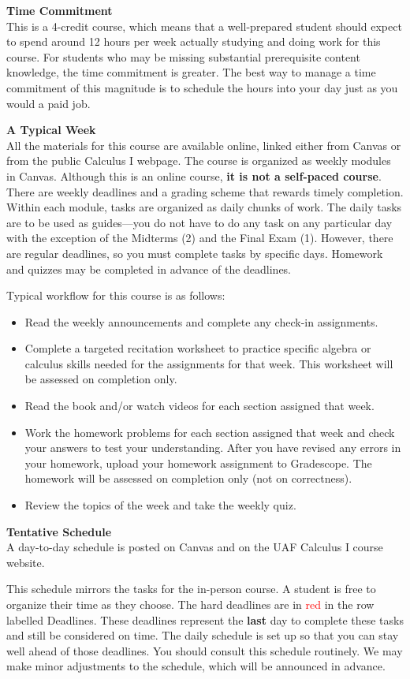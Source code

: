 \documentclass[12pt]{article}
\renewcommand{\emph}[1]{\textsf{\textbf{#1}}}
\newcommand{\localhead}[1]{\par\smallskip\textbf{#1}\nobreak\\}%
\def\heading#1{\localhead{\large\emph{#1}}}
\begin{document}
\heading{Time Commitment}
This is a 4-credit course, which means that a well-prepared student should expect to spend around 12
hours per week actually studying and doing work for this course. For students who may be missing substantial
prerequisite content knowledge, the time commitment is greater. The best way to manage a time
commitment of this magnitude is to schedule the hours into your day just as you would a paid job.

\heading{A Typical Week}
All the materials for this course are available online, linked either from Canvas or from the public Calculus I webpage. The course is organized as weekly modules in Canvas. Although this is an online course, \emph{it is not a self-paced course}. There are weekly
deadlines and a grading scheme that rewards timely completion. Within each module, tasks are
organized as daily chunks of work. The daily tasks are to be used as guides---you do not have
to do any task on any particular day with the exception of the Midterms (2) and the
Final Exam (1). However, there are regular deadlines, so you must complete tasks by specific days. Homework and quizzes may be completed in advance of the deadlines. 

Typical workflow for this course is as follows: 
\begin{itemize}
\item Read the weekly announcements and complete any check-in assignments.
\item Complete a targeted recitation worksheet to practice specific algebra or calculus skills needed for the assignments for that week. This worksheet will be assessed on completion only.
\item Read the book and/or watch videos for each section assigned that week.
\item Work the homework problems for each section assigned that week and check your answers to test your understanding. After you have revised any errors in your homework, upload your homework assignment to Gradescope. The homework will be assessed on completion only (not on correctness).
\item Review the topics of the week and take the weekly quiz.
\end{itemize}

\heading{Tentative Schedule}
A day-to-day schedule is posted on Canvas and on the UAF Calculus I course website. 

This schedule mirrors the tasks for the in-person course. A student is free to organize their time as they choose. The hard deadlines are in
\textcolor{red}{red} in the row labelled Deadlines. These deadlines represent the \textbf{last} day to complete these tasks
and still be considered on time. The daily schedule is set up so that you can stay well ahead of
those deadlines. You should consult this schedule routinely. We may make minor adjustments to
the schedule, which will be announced in advance.
\end{document}
